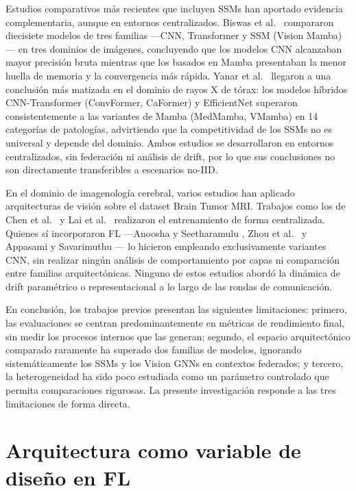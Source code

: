 Estudios comparativos más recientes que incluyen SSMs han aportado evidencia complementaria,
aunque en entornos centralizados.
Biswas et al.\ \cite{biswas2025comparative} compararon diecisiete modelos de tres familias
---CNN, Transformer y SSM (Vision Mamba)--- en tres dominios de imágenes, concluyendo que los
modelos CNN alcanzaban mayor precisión bruta mientras que los basados en Mamba presentaban la
menor huella de memoria y la convergencia más rápida.
Yanar et al.\ \cite{yanar2025comparative} llegaron a una conclusión más matizada en el dominio
de rayos X de tórax: los modelos híbridos CNN-Transformer (ConvFormer, CaFormer) y EfficientNet
superaron consistentemente a las variantes de Mamba (MedMamba, VMamba) en 14 categorías de
patologías, advirtiendo que la competitividad de los SSMs no es universal y depende del dominio.
Ambos estudios se desarrollaron en entornos centralizados, sin federación ni análisis de drift,
por lo que sus conclusiones no son directamente transferibles a escenarios no-IID.

En el dominio de imagenología cerebral, varios estudios han aplicado arquitecturas de visión sobre
el dataset Brain Tumor MRI.
Trabajos como los de Chen et al.\ \cite{chenfederated} y Lai et al.\ \cite{lai2025advancing}
realizaron el entrenamiento de forma centralizada.
Quienes sí incorporaron FL ---Anoosha y Seetharamulu \cite{anoosha2025federated}, Zhou et al.\
\cite{zhou2024distributedfederatedlearningbaseddeep} y Appasami y Savarimuthu
\cite{appasami2025federated}--- lo hicieron empleando exclusivamente variantes CNN, sin realizar
ningún análisis de comportamiento por capas ni comparación entre familias arquitectónicas.
Ninguno de estos estudios abordó la dinámica de drift paramétrico o representacional a lo largo
de las rondas de comunicación.

En conclusión, los trabajos previos presentan las siguientes limitaciones: primero, las evaluaciones se centran predominantemente en métricas de rendimiento
final, sin medir los procesos internos que las generan; segundo,
el espacio arquitectónico comparado raramente ha superado dos familias de modelos, ignorando sistemáticamente los SSMs
y los Vision GNNs en contextos federados; y tercero, la heterogeneidad ha sido poco estudiada como un parámetro controlado que permita comparaciones rigurosas.
La presente investigación responde a las tres limitaciones de forma directa.


\section{Arquitectura como variable de diseño en FL}

